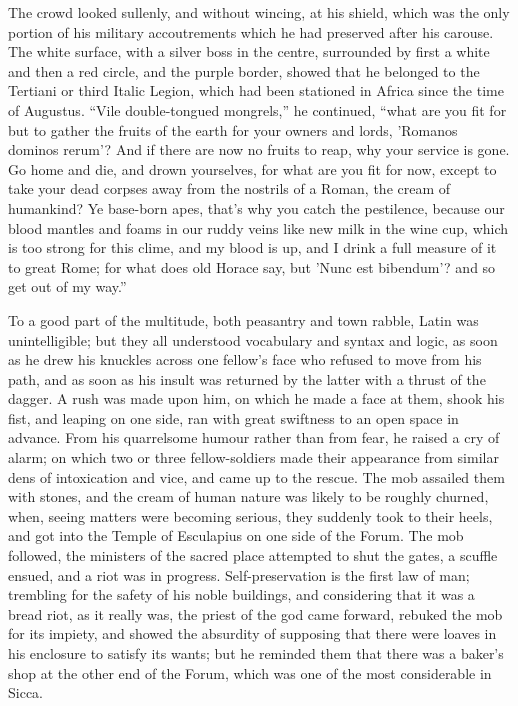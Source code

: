 The crowd looked sullenly, and without wincing, at his shield,
which was the only portion of his military accoutrements which he had
preserved after his carouse. The white surface, with a silver boss in
the centre, surrounded by first a white and then a red circle, and the
purple border, showed that he belonged to the Tertiani or third Italic
Legion, which had been stationed in Africa since the time of Augustus.
``Vile double-tongued mongrels,'' he continued, ``what are
you fit for but to gather the fruits of the earth for your owners and
lords, 'Romanos dominos rerum'? And if there are now no fruits
to reap, why your service is gone. Go home and die, and drown
yourselves, for what are you fit for now, except to take your dead
corpses away from the nostrils of a Roman, the cream of humankind? Ye
base-born apes, that's why you catch the pestilence, because our blood
mantles and foams in our ruddy veins like new milk in the wine cup,
which is too strong for this clime, and my blood is up, and I drink a
full measure of it to great Rome; for what does old Horace say, but 'Nunc
est bibendum'? and so get out of my way.''

To a good part of the multitude, both peasantry and town rabble,
Latin was unintelligible; but they all understood vocabulary and
syntax and logic, as soon as he drew his knuckles across one fellow's
face who refused to move from his path, and as soon as his insult was
returned by the latter with a thrust of the dagger. A rush was made
upon him, on which he made a face at them, shook his fist, and leaping
on one side, ran with great swiftness to an open space in advance.
From his quarrelsome humour rather than from fear, he raised a cry of
alarm; on which two or three fellow-soldiers made their appearance
from similar dens of intoxication and vice, and came up to the rescue.
The mob assailed them with stones, and the cream of human nature was
likely to be roughly churned, when, seeing matters were becoming
serious, they suddenly took to their heels, and got into the Temple of
Esculapius on one side of the Forum. The mob followed, the
ministers of the sacred place attempted to shut the gates, a scuffle
ensued, and a riot was in progress. Self-preservation is the first law
of man; trembling for the safety of his noble buildings, and
considering that it was a bread riot, as it really was, the priest of
the god came forward, rebuked the mob for its impiety, and showed the
absurdity of supposing that there were loaves in his enclosure to
satisfy its wants; but he reminded them that there was a baker's shop
at the other end of the Forum, which was one of the most considerable
in Sicca.

